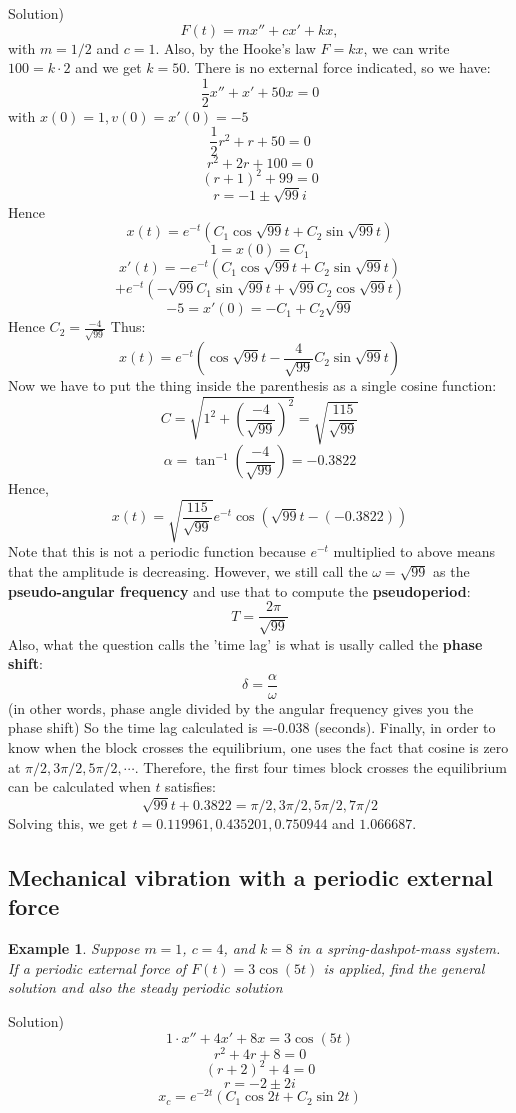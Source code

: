 \documentclass[12pt]{report}
\newtheorem{ex}{Example}[section]
\begin{document}
Solution)
$$F(t) = mx'' + cx'+kx,$$
with $m=1/2$ and $c=1$. Also, by the Hooke's law $F=kx$, we can write $100 = k\cdot 2$ and we get $k=50$. There is no external force indicated, so we have:
$$\frac{1}{2} x'' + x' + 50x =0$$
with $x(0)=1, v(0)=x'(0)=-5$
$$\frac{1}{2} r^2 +r +50=0$$
$$r^2 + 2r+100=0$$
$$(r+1)^2+99=0$$
$$r= -1 \pm \sqrt{99}i$$
Hence
$$x(t) = e^{-t} (C_1 \cos \sqrt{99} t +C_2 \sin \sqrt{99} t)$$
$$1 = x(0) = C_1$$
$$x'(t)= -e^{-t} (C_1 \cos \sqrt{99} t +C_2 \sin \sqrt{99} t)$$
$$+e^{-t} (-\sqrt{99}C_1 \sin \sqrt{99} t +\sqrt{99}C_2 \cos \sqrt{99} t)$$
$$-5= x'(0) = -C_1 + C_2\sqrt{99}$$
Hence $C_2=\frac{-4}{\sqrt{99}}$
Thus:
$$x(t) = e^{-t} ( \cos \sqrt{99} t -\frac{4}{\sqrt{99}}C_2 \sin \sqrt{99} t)$$
Now we have to put the thing inside the parenthesis as a single cosine function:
$$C=\sqrt{1^2 + \left(\frac{-4}{\sqrt{99}}\right)^2}=\sqrt{\frac{115}{\sqrt{99}}}$$
$$\alpha= \tan^{-1} \left(\frac{-4}{\sqrt{99}}\right) = -0.3822$$
Hence,
$$x(t) = \sqrt{\frac{115}{\sqrt{99}}} e^{-t} \cos(\sqrt{99} t -(-0.3822))$$
Note that this is not a periodic function because $e^{-t} $ multiplied to above means that the amplitude is decreasing. However, we still call the $\omega=\sqrt{99}$ as the \textbf{pseudo-angular frequency} and use that to compute the \textbf{pseudoperiod}:
$$T = \frac{2\pi}{\sqrt{99}}$$
Also, what the question calls the 'time lag' is what is usally called the \textbf{phase shift}:
$$\delta = \frac{\alpha}{\omega}$$
(in other words, phase angle divided by the angular frequency gives you the phase shift)
So the time lag calculated is =-0.038 (seconds).
Finally, in order to know when the block crosses the equilibrium, one uses the fact that cosine is zero at $\pi/2, 3\pi/2, 5\pi/2, \cdots$.
Therefore, the first four times block crosses the equilibrium can be calculated when $t$ satisfies:
$$\sqrt{99} t +0.3822 = \pi/2, 3\pi/2, 5\pi/2, 7\pi/2$$
Solving this, we get $t=0.119961, 0.435201, 0.750944$ and $1.066687$.

\subsection*{Mechanical vibration with a periodic external force}

\begin{ex} Suppose $m=1$, $c=4$, and $k=8$ in a spring-dashpot-mass system. If a periodic external force of $F(t)= 3 \cos (5t)$ is applied, find the general solution and also the steady periodic solution
	\end{ex}
Solution)
$$ 1\cdot x''+ 4x'+8x = 3\cos(5t)$$
$$r^2+4r+8=0$$
$$(r+2)^2+4=0$$
$$r=-2\pm 2i$$
$$x_c = e^{-2t} (C_1 \cos 2t + C_2 \sin 2t)$$
\end{document}
